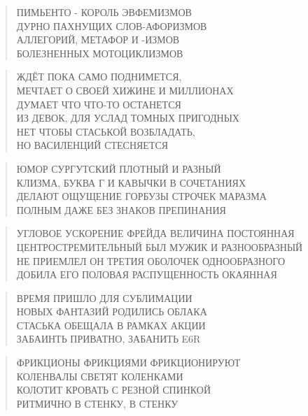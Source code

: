 \poemtitle{***}
\begin{verse}
ПИМЬЕНТО - КОРОЛЬ ЭВФЕМИЗМОВ\\
ДУРНО ПАХНУЩИХ СЛОВ-АФОРИЗМОВ\\
АЛЛЕГОРИЙ, МЕТАФОР И -ИЗМОВ\\
БОЛЕЗНЕННЫХ МОТОЦИКЛИЗМОВ
\end{verse}

\poemtitle{***}
\begin{verse}
ЖДЁТ ПОКА САМО ПОДНИМЕТСЯ,\\
МЕЧТАЕТ О СВОЕЙ ХИЖИНЕ И МИЛЛИОНАХ\\
ДУМАЕТ ЧТО ЧТО-ТО ОСТАНЕТСЯ\\
ИЗ ДЕВОК, ДЛЯ УСЛАД ТОМНЫХ ПРИГОДНЫХ\\
НЕТ ЧТОБЫ СТАСЬКОЙ ВОЗБЛАДАТЬ,\\
НО ВАСИЛЕНЦИЙ СТЕСНЯЕТСЯ
\end{verse}

\poemtitle{***}
\begin{verse}
ЮМОР СУРГУТСКИЙ ПЛОТНЫЙ И РАЗНЫЙ\\
КЛИЗМА, БУКВА Г И КАВЫЧКИ В СОЧЕТАНИЯХ\\
ДЕЛАЮТ ОЩУЩЕНИЕ ГОРБУЗЫ СТРОЧЕК МАРАЗМА\\
ПОЛНЫМ ДАЖЕ БЕЗ ЗНАКОВ ПРЕПИНАНИЯ
\end{verse}

\poemtitle{***}
\begin{verse}
УГЛОВОЕ УСКОРЕНИЕ ФРЕЙДА ВЕЛИЧИНА ПОСТОЯННАЯ\\
ЦЕНТРОСТРЕМИТЕЛЬНЫЙ БЫЛ МУЖИК И РАЗНООБРАЗНЫЙ\\
НЕ ПРИЕМЛЕЛ ОН ТРЕТИЯ ОБОЛОЧЕК ОДНООБРАЗНОГО\\
ДОБИЛА ЕГО ПОЛОВАЯ РАСПУЩЕННОСТЬ ОКАЯННАЯ
\end{verse}

\poemtitle{***}
\begin{verse}
ВРЕМЯ ПРИШЛО ДЛЯ СУБЛИМАЦИИ\\
НОВЫХ ФАНТАЗИЙ РОДИЛИСЬ ОБЛАКА\\
СТАСЬКА ОБЕЩАЛА В РАМКАХ АКЦИИ\\
ЗАБАИНТЬ ПРИВАТНО, ЗАБАНИТЬ E6R
\end{verse}

\poemtitle{***}
\begin{verse}
ФРИКЦИОНЫ ФРИКЦИЯМИ ФРИКЦИОНИРУЮТ\\
КОЛЕНВАЛЫ СВЕТЯТ КОЛЕНКАМИ\\
КОЛОТИТ КРОВАТЬ С РЕЗНОЙ СПИНКОЙ\\
РИТМИЧНО В СТЕНКУ, В СТЕНКУ
\end{verse}

